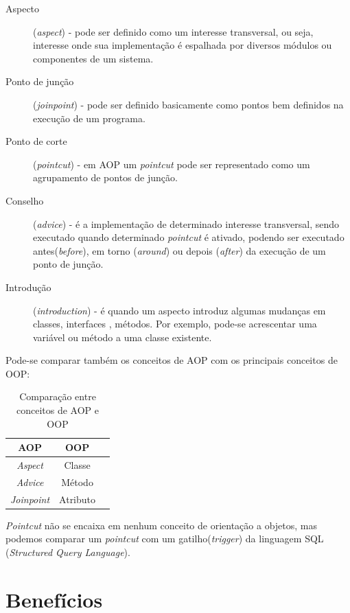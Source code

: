 \documentclass[tc,openright]{iiufrgs}
\begin{document}
\begin{description}
\item [Aspecto] (\textit{aspect}) - pode ser definido como um interesse transversal, ou seja, interesse onde sua implementação é espalhada por diversos módulos ou componentes de um sistema.
\item [Ponto de junção] (\textit{joinpoint}) - pode ser definido basicamente como pontos bem definidos na execução de um programa.
\item [Ponto de corte] (\textit{pointcut}) - em AOP um \textit{pointcut} pode ser representado como um agrupamento de pontos de junção.
\item [Conselho] (\textit{advice}) - é a implementação de determinado interesse transversal, sendo executado quando determinado \textit{pointcut} é ativado, podendo ser executado antes(\textit{before}), em torno (\textit{around}) ou depois (\textit{after}) da execução de um ponto de junção.
\item [Introdução] (\textit{introduction}) - é quando um aspecto introduz algumas mudanças em classes, interfaces , métodos. Por exemplo, pode-se acrescentar uma variável ou método a uma classe existente. \cite{laddad2003aspectj}

\end{description}


Pode-se comparar também os conceitos de AOP com os principais conceitos de OOP:

\begin{table}[ht]
	\centering
	\caption{Comparação entre conceitos de AOP e OOP}
	\begin{tabular}[h]{c c l}
		\hline 
		\textbf{AOP} & \textbf{OOP} \\
		\hline
		\textit{Aspect}&Classe \\
		\textit{Advice}&Método \\
		\textit{Joinpoint}&Atributo \\
		\hline
	\end{tabular}
	\label{tab:comparacaoAOPOOP}
\end{table}

\textit{Pointcut} não se encaixa em nenhum conceito de orientação a objetos, mas podemos comparar um \textit{pointcut} com um gatilho(\textit{trigger}) da linguagem SQL (\textit{Structured Query Language}).

\section{Benefícios}
\end{document}
